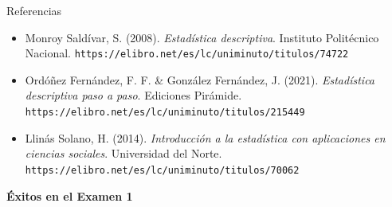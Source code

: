 \documentclass[aspectratio=169,10pt]{beamer}
\begin{document}
\begin{frame}{Referencias}
  \footnotesize
  \begin{itemize}
    \item[{[1]}] Monroy Saldívar, S. (2008). \textit{Estadística descriptiva}.
      Instituto Politécnico Nacional.
      \texttt{https://elibro.net/es/lc/uniminuto/titulos/74722}
    \item[{[2]}] Ordóñez Fernández, F. F. \& González Fernández, J. (2021).
      \textit{Estadística descriptiva paso a paso}. Ediciones Pirámide.
      \texttt{https://elibro.net/es/lc/uniminuto/titulos/215449}
    \item[{[3]}] Llinás Solano, H. (2014). \textit{Introducción a la
      estadística con aplicaciones en ciencias sociales}. Universidad del
      Norte. \texttt{https://elibro.net/es/lc/uniminuto/titulos/70062}
  \end{itemize}

  \vspace{0.35cm}
  \begin{center}
    {\Large\color{uniAzul}\textbf{Éxitos en el Examen 1}}
  \end{center}
\end{frame}
\end{document}

